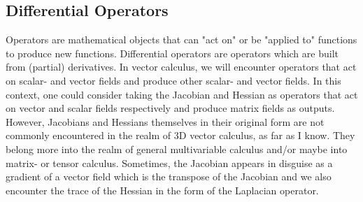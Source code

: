 \subsection{Differential Operators}
Operators are mathematical objects that can "act on" or be "applied to" functions to produce new functions. Differential operators are operators which are built from (partial) derivatives. In vector calculus, we will encounter operators that act on scalar- and vector fields and produce other scalar- and vector fields. In this context, one could consider taking the Jacobian and Hessian as operators that act on vector and scalar fields respectively and produce matrix fields as outputs. However, Jacobians and Hessians themselves in their original form are not commonly encountered in the realm of 3D vector calculus, as far as I know. They belong more into the realm of general multivariable calculus and/or maybe into matrix- or tensor calculus. Sometimes, the Jacobian appears in disguise as a gradient of a vector field which is the transpose of the Jacobian and we also encounter the trace of the Hessian in the form of the Laplacian operator.



